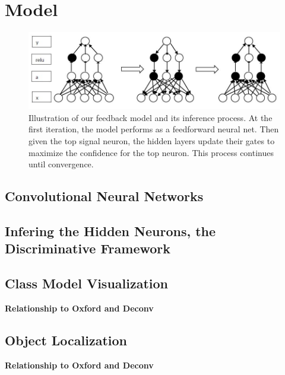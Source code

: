 \section{Model}
\label{sec:model}

\setlength{\tabcolsep}{2pt}
\begin{figure}
\begin{center}
\includegraphics[width=0.95\linewidth]{figs/model/iteration}
\caption{Illustration of our feedback model and its inference process. At the first iteration, the model performs as a feedforward neural net. Then given the top signal neuron, the hidden layers update their gates to maximize the confidence for the top neuron. This process continues until convergence.}
\label{fig:visual_compare}
\end{center}
\end{figure}

\subsection{Convolutional Neural Networks}

\subsection{Infering the Hidden Neurons, the Discriminative Framework}

\subsection{Class Model Visualization}

\textbf{Relationship to Oxford and Deconv}

\subsection{Object Localization}

\textbf{Relationship to Oxford and Deconv}
